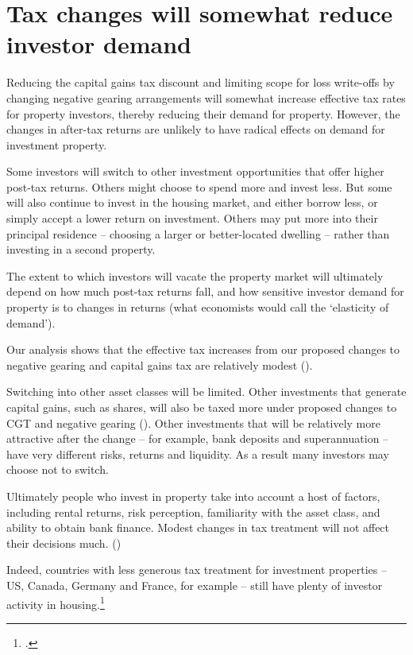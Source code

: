 \section{Tax changes will somewhat reduce investor demand}
Reducing the capital gains tax discount and limiting scope for loss write-offs by changing negative gearing arrangements will somewhat increase effective tax rates for property investors, thereby reducing their demand for property. 
However, the changes in after-tax returns are unlikely to have radical effects on demand for investment property.

Some investors will switch to other investment opportunities that offer higher post-tax returns. Others might choose to spend more and invest less. But some will also continue to invest in the housing market, and either borrow less, or simply accept a lower return on investment. Others may put more into their principal residence – choosing a larger or better-located dwelling – rather than investing in a second property.

The extent to which investors will vacate the property market will ultimately depend on how much post-tax returns fall, and how sensitive investor demand for property is to changes in returns (what economists would call the ‘elasticity of demand’).

Our analysis shows that the effective tax increases from our proposed changes to negative gearing and capital gains tax are relatively modest (). 

Switching into other asset classes will be limited. Other investments that generate capital gains, such as shares, will also be taxed more under proposed changes to CGT and negative gearing (). Other investments that will be relatively more attractive after the change – for example, bank deposits and superannuation – have very different risks, returns and liquidity. As a result many investors may choose not to switch. 

Ultimately people who invest in property take into account a host of factors, including rental returns, risk perception, familiarity with the asset class, and ability to obtain bank finance. Modest changes in tax treatment will not affect their decisions much. ()

Indeed, countries with less generous tax treatment for investment properties – US, Canada, Germany and France, for example – still have plenty of investor activity in housing.\footcite{ABS2010MeasuresOfAustraliasProgress}



